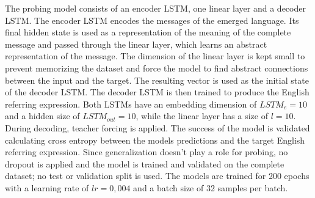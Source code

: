 The probing model consists of an encoder LSTM, one linear layer and a decoder LSTM.
The encoder LSTM encodes the messages of the emerged language.
Its final hidden state is used as a representation of the meaning of the complete message and passed through the linear layer, which learns an abstract representation of the message.
The dimension of the linear layer is kept small to prevent memorizing the dataset and force the model to find abstract connections between the input and the target.
The resulting vector is used as the initial state of the decoder LSTM.
The decoder LSTM is then trained to produce the English referring expression.
Both LSTMs have an embedding dimension of $LSTM_e=10$ and a hidden size of $LSTM_{out}=10$, while the linear layer has a size of $l=10$.
During decoding, teacher forcing is applied.
The success of the model is validated calculating cross entropy between the models predictions and the target English referring expression.
Since generalization doesn't play a role for probing, no dropout is applied and the model is trained and validated on the complete dataset; no test or validation split is used.
The models are trained for 200 epochs with a learning rate of $lr=0,004$ and a batch size of 32 samples per batch.

